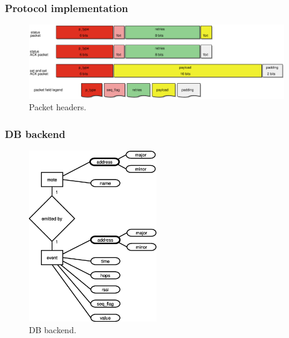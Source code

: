 \documentclass{beamer}
\begin{document}
\begin{frame}
\frametitle{Protocol implementation}

	\begin{center}
		\begin{figure}
			\includegraphics[width=1.05\textwidth]{packet.eps}
			\caption{Packet headers.}
		\end{figure}
	\end{center}
	
\end{frame}

\begin{frame}
\frametitle{DB backend}

	\begin{center}
		\begin{figure}
			\includegraphics[width=0.5\textwidth]{dbbackend.eps}
			\caption{DB backend.}
		\end{figure}
	\end{center}

\end{frame}
\end{document}
